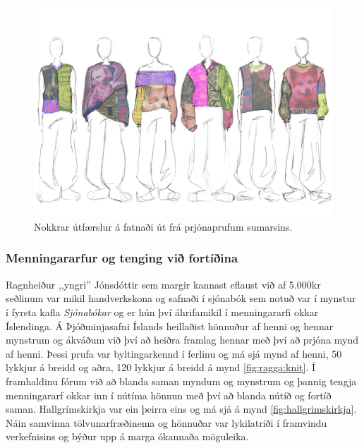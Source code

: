 \begin{figure}[t]
    \centering
    \includegraphics[width=.85\linewidth]{myndir/gisa/collection.JPG}
    \caption{Nokkrar útfærslur á fatnaði út frá prjónaprufum sumarsins.}
    \label{fig:designproposal}
\end{figure}

\subsubsection{Menningararfur og tenging við fortíðina}
Ragnheiður ,,yngri'' Jónsdóttir sem margir kannast eflaust við af 5.000kr seðlinum var mikil handverkskona og safnaði í sjónabók sem notuð var í mynstur í fyrsta kafla \textit{Sjónabókar} og er hún því áhrifamikil í menningararfi okkar Íslendinga. Á Þjóðminjasafni Íslands heillaðist hönnuður af henni og hennar mynstrum og ákváðum við því að heiðra framlag hennar með því að prjóna mynd af henni. Þessi prufa var byltingarkennd í ferlinu og má sjá mynd af henni, 50 lykkjur á breidd og aðra, 120 lykkjur á breidd á mynd \ref{fig:ragga:knit}. Í framhaldinu fórum við að blanda saman myndum og mynstrum og þannig tengja menningararf okkar inn í nútíma hönnun með því að blanda nútíð og fortíð saman. Hallgrímskirkja var ein þeirra eins og má sjá á mynd \ref{fig:hallgrimskirkja}. Náin samvinna tölvunarfræðinema og hönnuðar var lykilatriði í framvindu verkefnisins og býður upp á marga ókannaða möguleika. 

